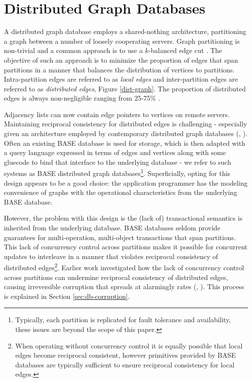 \section{Distributed Graph Databases}
\label{sec:distr-graph-datab}

A distributed graph database employs a shared-nothing architecture, partitioning a graph between a number of loosely cooperating servers. Graph partitioning is non-trivial and a common approach is to use a $k$-balanced edge cut \cite{Huang2016}. The objective of such an approach is to minimize the proportion of edges that span partitions in a manner that balances the distribution of vertices to partitions. Intra-partition edges are referred to as \textit{local edges} and inter-partition edges are referred to as \textit{distributed edges}, Figure \ref{dist-graph}. The proportion of distributed edges is always non-negligible ranging from 25-75\% \cite{Huang2016}.



Adjacency lists can now contain edge pointers to vertices on remote servers. Maintaining reciprocal consistency for distributed edges is challenging - especially given an architecture employed by contemporary distributed graph databases (\cite{janusgraph}, \cite{TitanDB}). Often an existing BASE database is used for storage, which is then adapted with a query language expressed in terms of edges and vertices along with some gluecode to bind that interface to the underlying database - we refer to such systems as BASE distributed graph databases\footnote{Typically, each partition is replicated for fault tolerance and availability, these issues are beyond the scope of this paper.}. Superficially, opting for this design appears to be a good choice: the application programmer has the modeling convenience of graphs with the operational characteristics from the underlying BASE database.

However, the problem with this design is the (lack of) transactional semantics is inherited from the underlying database. BASE databases seldom provide guarantees for multi-operation, multi-object transactions that span partitions. This lack of concurrency control across partitions makes it possible for concurrent updates to interleave in a manner that violates reciprocal consistency of distributed edges\footnote{When operating without concurrency control it is equally possible that local edges become reciprocal consistent, however primitives provided by BASE databases are typically sufficient to ensure reciprocal consistency for local edges.}. Earlier work investigated how the lack of concurrency control across partitions can undermine reciprocal consistency of distributed edges, causing irreversible corruption that spreads at alarmingly rates (\cite{Ezhilchelvan2018}, \cite{Webber2019}). This process is explained in Section \ref{sec:db-corruption}.




